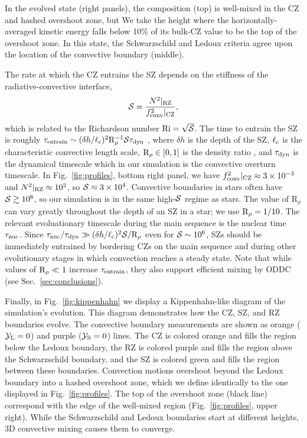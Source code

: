 In the evolved state (right panels), the composition (top) is well-mixed in the CZ and hashed overshoot zone, but 
We take the height where the horizontally-averaged kinetic energy falls below 10\% of its bulk-CZ value to be the top of the overshoot zone.
In this  state, the Schwarzschild and Ledoux criteria agree upon the location of the convective boundary (middle).

The rate at which the CZ entrains the SZ depends on the stiffness of the radiative-convective interface,
\begin{equation}
\mS = \frac{N^2|_{\rm{RZ}}}{f_{\rm{conv}}^2|_{\rm{CZ}}},
\label{eqn:stiffness}
\end{equation}
which is related to the Richardson number ${\rm{Ri} = \sqrt{\mathcal{S}}}$.
The time to entrain the SZ is roughly ${\tau_{\rm{entrain}} \sim (\delta h / \ell_{\rm{c}})^2 \rm{R}_{\rho}^{-1} \mathcal{S} \tau_{\rm{dyn}}}$ \citep[per][eqn.~3]{fuentes_cumming_2020}, where $\delta h$ is the depth of the SZ, $\ell_{\rm{c}}$ is the characteristic convective length scale, $\mathrm{R}_{\rho} \in [0, 1]$ is the density ratio \citep[see][eqn.~7]{garaud_2018}, and $\tau_{\rm{dyn}}$ is the dynamical timescale which in our simulation is the convective overturn timescale.
In Fig.~\ref{fig:profiles}, bottom right panel, we have $f_{\rm{conv}}^2|_{\rm{CZ}} \approx 3 \times 10^{-3}$ and $N^2|_{\rm{RZ}} \approx 10^2$, so $\mathcal{S} \approx 3 \times 10^4$.
Convective boundaries in stars often have $\mathcal{S} \gtrsim 10^6$, so our simulation is in the same high-$\mathcal{S}$ regime as stars.
The value of $\mathrm{R}_{\rho}$ can vary greatly throughout the depth of an SZ in a star; we use $\rm{R}_\rho = 1/10$.
The relevant evoluationary timescale during the main sequence is the nuclear time $\tau_{\rm{nuc}}$.
Since $\tau_{\rm{nuc}}/\tau_{\rm{dyn}} \gg (\delta h/\ell_{\rm{c}})^2 \mathcal{S}/\mathrm{R}_{\rho}$ even for $\mathcal{S} \sim 10^6$, SZs should be immediately entrained by bordering CZs on the main sequence and during other evolutionary stages in which convection reaches a steady state.
Note that while values of $\mathrm{R}_{\rho} \ll 1$ increase $\tau_{\rm{entrain}}$, they also support efficient mixing by ODDC (see Sec.~\ref{sec:conclusions}).

Finally, in Fig.~\ref{fig:kippenhahn} we display a Kippenhahn-like diagram of the simulation's evolution.
This diagram demonstrates how the CZ, SZ, and RZ boundaries evolve.
The convective boundary measurements are shown as orange ($\mathcal{Y}_{\rm{L}} = 0$) and purple ($\mathcal{Y}_{\rm{S}} = 0$) lines.
The CZ is colored orange and fills the region below the Ledoux boundary, the RZ is colored purple and fills the region above the Schwarzschild boundary, and the SZ is colored green and fills the region between these boundaries.
Convection motions overshoot beyond the Ledoux boundary into a hashed overshoot zone, which we define identically to the one displayed in Fig.~\ref{fig:profiles}.
The top of the overshoot zone (black line) correspond with the edge of the well-mixed region (Fig.~\ref{fig:profiles}, upper right).
While the Schwarzschild and Ledoux boundaries start at different heights, 3D convective mixing causes them to converge.

